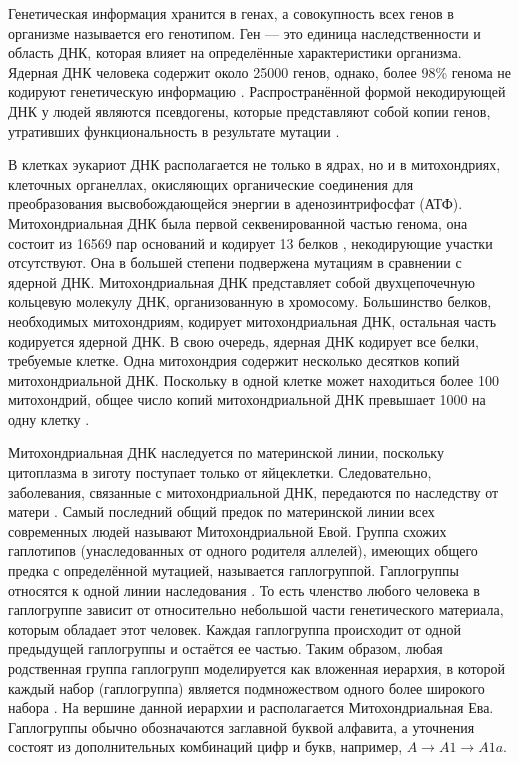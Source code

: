 Генетическая информация хранится в генах, а совокупность всех генов в организме называется его генотипом. Ген --- это единица наследственности и область ДНК, которая влияет на определённые характеристики организма. Ядерная ДНК человека содержит около 25000 генов, однако, более 98\% генома не кодируют генетическую информацию \autocite{Wolfsberg2001}. Распространённой формой некодирующей ДНК у людей являются псевдогены, которые представляют собой копии генов, утративших функциональность в результате мутации \autocite{Harrison2002}.

В клетках эукариот ДНК располагается не только в ядрах, но и в митохондриях, клеточных органеллах, окисляющих органические соединения для преобразования высвобождающейся энергии в аденозинтрифосфат (АТФ). Митохондриальная ДНК была первой секвенированной частью генома, она состоит из 16569 пар оснований и кодирует 13 белков \autocite{Anderson1981}, некодирующие участки отсутствуют. Она в большей степени подвержена мутациям в сравнении с ядерной ДНК. Митохондриальная ДНК представляет собой двухцепочечную кольцевую молекулу ДНК, организованную в хромосому. Большинство белков, необходимых митохондриям, кодирует митохондриальная ДНК, остальная часть кодируется ядерной ДНК. В свою очередь, ядерная ДНК кодирует все белки, требуемые клетке. Одна митохондрия содержит несколько десятков копий митохондриальной ДНК. Поскольку в одной клетке может находиться более 100 митохондрий, общее число копий митохондриальной ДНК превышает 1000 на одну клетку \autocite{lodish2012molecular}. 

Митохондриальная ДНК наследуется по материнской линии, поскольку цитоплазма в зиготу поступает только от яйцеклетки. Следовательно, заболевания, связанные с митохондриальной ДНК, передаются по наследству от матери \autocite{cooper2004cell}. Самый последний общий предок по материнской линии всех современных людей называют Митохондриальной Евой. Группа схожих гаплотипов (унаследованных от одного родителя аллелей), имеющих общего предка с определённой мутацией, называется гаплогруппой. Гаплогруппы относятся к одной линии наследования \autocite{cox2016biogeography}. То есть членство любого человека в гаплогруппе зависит от относительно небольшой части генетического материала, которым обладает этот человек. Каждая гаплогруппа происходит от одной предыдущей гаплогруппы и остаётся ее частью. Таким образом, любая родственная группа гаплогрупп моделируется как вложенная иерархия, в которой каждый набор (гаплогруппа) является подмножеством одного более широкого набора \autocite{Arora2015}. На вершине данной иерархии и располагается Митохондриальная Ева. Гаплогруппы обычно обозначаются заглавной буквой алфавита, а уточнения состоят из дополнительных комбинаций цифр и букв, например, $A \rightarrow A1 \rightarrow A1a$.

